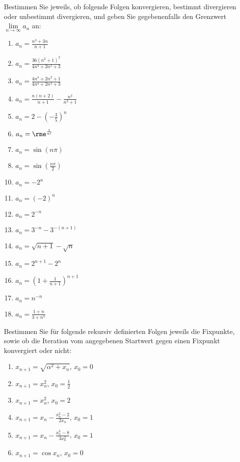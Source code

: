 Bestimmen Sie jeweils, ob folgende Folgen konvergieren, bestimmt divergieren oder unbestimmt divergieren, und geben Sie gegebenenfalls den Grenzwert $\lim\limits_{n\to\infty} a_n$ an:\\
\parbox{0.5\textwidth}{\begin{enumerate}
\item $a_n=\frac{n^3+3n}{n+1}$
\item $a_n=\frac{36(n^2+1)^2}{4n^4+2n^3+3}$
\item $a_n=\frac{4n^4+2n^2+1}{4n^4+2n^3+3}$
\item $a_n=\frac{n(n+2)}{n+1}-\frac{n^3}{n^2+1}$
\item $a_n=2-\left(-\frac{3}{5}\right)^n$
\item $a_n=\rme^{\frac{1}{n!}}$
\item $a_n=\sin(n\pi)$
\item $a_n=\sin\left(\frac{n\pi}{2}\right)$
\end{enumerate}}\parbox{0.5\textwidth}{\begin{enumerate}\setcounter{enumi}{9}
\item $a_n=-2^n$
\item $a_n=(-2)^n$
\item $a_n=2^{-n}$
\item $a_n=3^{-n}-3^{-(n+1)}$
\item $a_n=\sqrt{n+1}-\sqrt{n}$
\item $a_n=2^{n+1}-2^n$
\item $a_n=\left(1+\frac{1}{n+1}\right)^{n+1}$
\item $a_n=n^{-n}$
\item $a_n=\frac{1+n}{3+n^n}$
\end{enumerate}}




Bestimmen Sie für folgende rekursiv definierten Folgen jeweils die Fixpunkte, sowie ob die Iteration vom angegebenen Startwert gegen einen Fixpunkt konvergiert oder nicht:\\
\parbox{0.5\textwidth}{\begin{enumerate}
\item $x_{n+1}=\sqrt{\alpha^2+x_n}$, $x_0=0$
\item $x_{n+1}=x_n^2$, $x_0=\frac{1}{2}$
\item $x_{n+1}=x_n^2$, $x_0=2$
\end{enumerate}}\parbox{0.5\textwidth}{\begin{enumerate}\setcounter{enumi}{3}
\item $x_{n+1}=x_n-\frac{x_n^2-2}{2x_n}$, $x_0=1$
\item $x_{n+1}=x_n-\frac{x_n^3-8}{3x_n^2}$, $x_0=1$
\item $x_{n+1}=\cos x_n$, $x_0=0$
\end{enumerate}}




